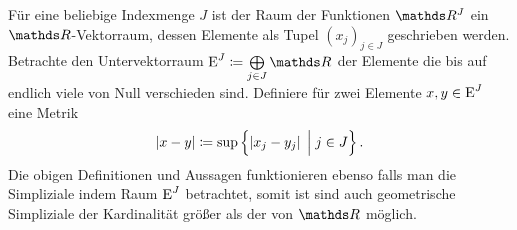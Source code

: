 \begin{Bem}
  Für eine beliebige Indexmenge $J$ ist der Raum der Funktionen $\R^J$ ein
  $\R$-Vektorraum, dessen Elemente als Tupel $(x_j)_{j \in J}$
  geschrieben werden. Betrachte den Untervektorraum
  $\E^J \coloneqq \bigoplus\limits_{j \in J} \R$ der Elemente die bis
  auf endlich viele von Null verschieden sind. Definiere für zwei
  Elemente $x,y \in \operatorname{E}^J$ eine Metrik
  \begin{gather*}
    \left| x-y \right| \coloneqq \sup \left\{  \left| x_j - y_j  \right|  \; \Big| \;  j \in J \right\}.
  \end{gather*}
  Die obigen Definitionen und Aussagen funktionieren ebenso falls man
  die Simpliziale indem Raum $\operatorname{E}^J$ betrachtet, somit ist sind 
  auch geometrische Simpliziale der Kardinalität größer als der von $\R$
  möglich.
\end{Bem}




